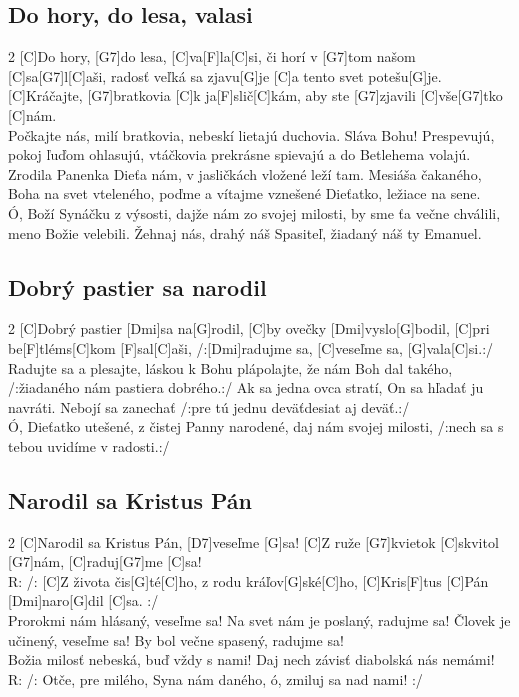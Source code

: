 \documentclass[12pt]{article}
\begin{document}
\subsection{Do hory, do lesa, valasi}
\begin{multicols}{2}
	[C]Do hory, [G7]do lesa, [C]va[F]la[C]si,
	či horí v [G7]tom našom [C]sa[G7]l[C]aši,
	radosť veľká sa zjavu[G]je
	[C]a tento svet potešu[G]je.
	[C]Kráčajte, [G7]bratkovia [C]k ja[F]slič[C]kám,
	aby ste [G7]zjavili [C]vše[G7]tko [C]nám.
	\\
	Počkajte nás, milí bratkovia,
	nebeskí lietajú duchovia.
	Sláva Bohu! Prespevujú,
	pokoj ľuďom ohlasujú,
	vtáčkovia prekrásne spievajú
	a do Betlehema volajú.
	\columnbreak
	Zrodila Panenka Dieťa nám,
	v jasličkách vložené leží tam.
	Mesiáša čakaného,
	Boha na svet vteleného,
	poďme a vítajme vznešené
	Dieťatko, ležiace na sene.
	\\
	Ó, Boží Synáčku z výsosti,
	dajže nám zo svojej milosti,
	by sme ťa večne chválili,
	meno Božie velebili.
	Žehnaj nás, drahý náš Spasiteľ,
	žiadaný náš ty Emanuel.
\end{multicols}

\subsection{Dobrý pastier sa narodil}
\begin{multicols}{2}
	[C]Dobrý pastier [Dmi]sa na[G]rodil, 
	[C]by ovečky [Dmi]vyslo[G]bodil,
	[C]pri be[F]tléms[C]kom [F]sal[C]aši, 
	/:[Dmi]radujme sa, [C]veseľme sa, [G]vala[C]si.:/
	\\
	Radujte sa a plesajte, 
	láskou k Bohu plápolajte,
	že nám Boh dal takého, 
	/:žiadaného nám pastiera dobrého.:/
	\columnbreak
	Ak sa jedna ovca stratí, 
	On sa hľadať ju navráti.
	Nebojí sa zanechať 
	/:pre tú jednu deväťdesiat aj deväť.:/
	\\
	Ó, Dieťatko utešené, 
	z čistej Panny narodené,
	daj nám svojej milosti, 
	/:nech sa s tebou uvidíme v radosti.:/
\end{multicols}

\subsection{Narodil sa Kristus Pán}
\begin{multicols}{2}
	[C]Narodil sa Kristus Pán, [D7]veseľme [G]sa!
	[C]Z ruže [G7]kvietok [C]skvitol [G7]nám, [C]raduj[G7]me [C]sa!
	\\
	R: /: [C]Z života čis[G]té[C]ho, 
	z rodu kráľov[G]ské[C]ho,
	[C]Kris[F]tus [C]Pán [Dmi]naro[G]dil [C]sa. :/
	\\
	Prorokmi nám hlásaný, veseľme sa!
	Na svet nám je poslaný, radujme sa!
	\columnbreak
	Človek je učinený, veseľme sa!
	By bol večne spasený, radujme sa!
	\\
	Božia milosť nebeská, buď vždy s nami!
	Daj nech závisť diabolská nás nemámi!
	\\
	R: /: Otče, pre milého, 
	Syna nám daného, 
	ó, zmiluj sa nad nami! :/
\end{multicols}
\end{document}
